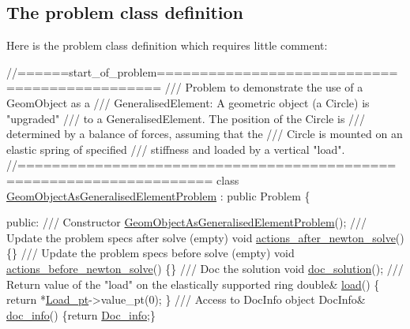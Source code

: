 \hypertarget{index_class}{}\subsection{The problem class definition}\label{index_class}
Here is the problem class definition which requires little comment\+:

 
\begin{DoxyCodeInclude}
\textcolor{comment}{//======start\_of\_problem==============================================}
\textcolor{comment}{/// Problem to demonstrate the use of a GeomObject as a }
\textcolor{comment}{}\textcolor{comment}{/// GeneralisedElement: A geometric object (a Circle) is "upgraded"}
\textcolor{comment}{}\textcolor{comment}{/// to a GeneralisedElement. The position of the Circle is}
\textcolor{comment}{}\textcolor{comment}{/// determined by a balance of forces, assuming that the}
\textcolor{comment}{}\textcolor{comment}{/// Circle is mounted on an elastic spring of specified}
\textcolor{comment}{}\textcolor{comment}{/// stiffness and loaded by a vertical "load". }
\textcolor{comment}{}\textcolor{comment}{//====================================================================}
\textcolor{keyword}{class }\hyperlink{classGeomObjectAsGeneralisedElementProblem}{GeomObjectAsGeneralisedElementProblem} : \textcolor{keyword}{public} Problem
\{

\textcolor{keyword}{public}:
\textcolor{comment}{}
\textcolor{comment}{ /// Constructor}
\textcolor{comment}{} \hyperlink{classGeomObjectAsGeneralisedElementProblem_ad1f15fcb6c055c58d1f71b522f1f7bd6}{GeomObjectAsGeneralisedElementProblem}();
\textcolor{comment}{}
\textcolor{comment}{ /// Update the problem specs after solve (empty)}
\textcolor{comment}{} \textcolor{keywordtype}{void} \hyperlink{classGeomObjectAsGeneralisedElementProblem_af396d1789e2552c43e0c68561d88d473}{actions\_after\_newton\_solve}()\{\}
  \textcolor{comment}{}
\textcolor{comment}{ /// Update the problem specs before solve (empty)}
\textcolor{comment}{} \textcolor{keywordtype}{void} \hyperlink{classGeomObjectAsGeneralisedElementProblem_a4ae01862ddbbeeacca1ce7a444e28931}{actions\_before\_newton\_solve}() \{\}
\textcolor{comment}{}
\textcolor{comment}{ /// Doc the solution}
\textcolor{comment}{} \textcolor{keywordtype}{void} \hyperlink{classGeomObjectAsGeneralisedElementProblem_a5092be8e6172d6c9147115bdd485db35}{doc\_solution}();
\textcolor{comment}{}
\textcolor{comment}{ /// Return value of the "load" on the elastically supported ring}
\textcolor{comment}{} \textcolor{keywordtype}{double}& \hyperlink{classGeomObjectAsGeneralisedElementProblem_a5ae799de23742e4c8fa54ee7ae32e679}{load}()
  \{
   \textcolor{keywordflow}{return} *\hyperlink{classGeomObjectAsGeneralisedElementProblem_ac04469b2dbce010fff3f5b2cf5591bcd}{Load\_pt}->value\_pt(0);
  \}
\textcolor{comment}{}
\textcolor{comment}{ /// Access to DocInfo object}
\textcolor{comment}{} DocInfo& \hyperlink{classGeomObjectAsGeneralisedElementProblem_a4be869d81c0df187d4239a590826f139}{doc\_info}() \{\textcolor{keywordflow}{return} \hyperlink{classGeomObjectAsGeneralisedElementProblem_a89a7f5fa555839193166f802d6ff6be2}{Doc\_info};\}


\end{DoxyCodeInclude}

